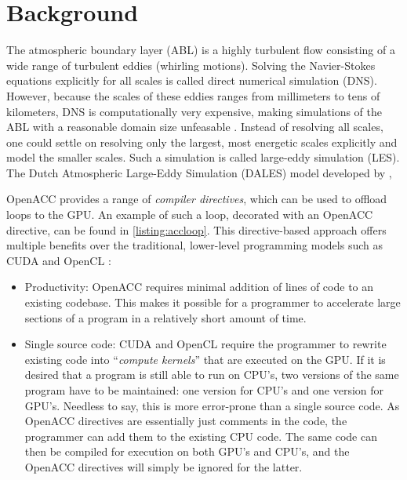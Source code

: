 \section{Background}
The atmospheric boundary layer (ABL) is a highly turbulent flow consisting of a wide range of turbulent eddies (whirling motions). Solving the Navier-Stokes equations explicitly for all scales is called direct numerical simulation (DNS). However, because the scales of these eddies ranges from millimeters to tens of kilometers, DNS is computationally very expensive, making simulations of the ABL with a reasonable domain size unfeasable \citep{moengNUMERICALMODELSLargeEddy2015}. Instead of resolving all scales, one could settle on resolving only the largest, most energetic scales explicitly and model the smaller scales. Such a simulation is called large-eddy simulation (LES). The Dutch Atmospheric Large-Eddy Simulation (DALES) model developed by \citet{heusFormulationDutchAtmospheric2010}, 

OpenACC provides a range of \emph{compiler directives}, which can be used to offload loops to the GPU. An example of such a loop, decorated with an OpenACC directive, can be found in \autoref{listing:accloop}. This directive-based approach offers multiple benefits over the traditional, lower-level programming models such as CUDA and OpenCL \citep{herdmanAcceleratingHydrocodesOpenACC2012}:

\begin{itemize}
    \item Productivity: OpenACC requires minimal addition of lines of code to an existing codebase. This makes it possible for a programmer to accelerate large sections of a program in a relatively short amount of time. 
    \item Single source code: CUDA and OpenCL require the programmer to rewrite existing code into ``\emph{compute kernels}'' that are executed on the GPU. If it is desired that a program is still able to run on CPU's, two versions of the same program have to be maintained: one version for CPU's and one version for GPU's. Needless to say, this is more error-prone than a single source code. As OpenACC directives are essentially just comments in the code, the programmer can add them to the existing CPU code. The same code can then be compiled for execution on both GPU's and CPU's, and the OpenACC directives will simply be ignored for the latter.
\end{itemize}

